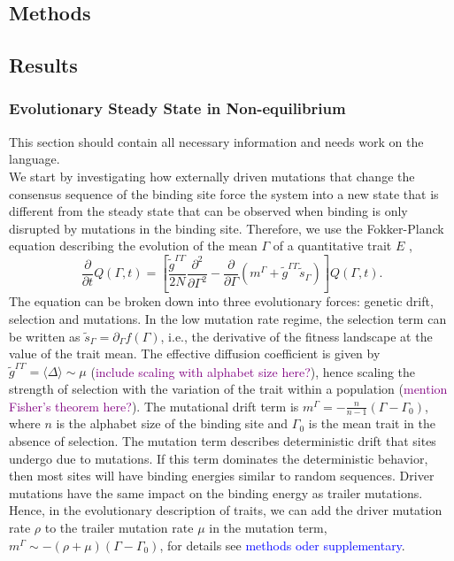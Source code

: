 \documentclass[10pt,a4paper]{article}
\newcommand{\purple}[1]{\textcolor{purple}{#1}}
\begin{document}
	\subsection*{Methods}
	

	

	\subsection*{Results}
	\subsubsection*{Evolutionary Steady State in Non-equilibrium}
	{\color{ForestGreen} This section should contain all necessary information and needs work on the language.}\\
	We start by investigating how externally driven mutations that change the consensus sequence of the binding site force the system into a new state that is different from the steady state that can be observed when binding is only disrupted by mutations in the binding site. Therefore, we use the Fokker-Planck equation describing the evolution of the mean $\Gamma$ of a quantitative trait $E$ \cite{nourmohammad_evolution_2013},
	\begin{equation}
		\frac{\partial}{\partial t}Q(\Gamma,t)=\left[\frac{\tilde{g}^{\Gamma\Gamma}}{2N}\frac{\partial^2}{\partial\Gamma^2}- \frac{\partial}{\partial\Gamma}\left(m^\Gamma+\tilde{g}^{\Gamma\Gamma}\tilde{s}_\Gamma\right)\right]Q(\Gamma,t)\label{equ:trait_diffusion}.
	\end{equation}
	The equation can be broken down into three evolutionary forces: genetic drift, selection and mutations. In the low mutation rate regime, the selection term can be written as $\tilde{s}_\Gamma = \partial_\Gamma f(\Gamma)$, i.e., the derivative of the fitness landscape at the value of the trait mean. The effective diffusion coefficient is given by $\tilde g^{\Gamma\Gamma} = \langle \Delta\rangle \sim \mu$ (\purple{include scaling with alphabet size here?}), hence scaling the strength of selection with the variation of the trait within a population (\purple{mention Fisher's theorem here?}). 
	The mutational drift term is $m^\Gamma = -\frac{n}{n-1} (\Gamma-\Gamma_0)$, where $n$ is the alphabet size of the binding site and $\Gamma_0$ is the mean trait in the absence of selection. 
	The mutation term describes deterministic drift that sites undergo due to mutations. If this term dominates the deterministic behavior, then most sites will have binding energies similar to random sequences. Driver mutations have the same impact on the binding energy as trailer mutations. Hence, in the evolutionary description of traits, we can add the driver mutation rate $\rho$ to the trailer mutation rate $\mu$ in the mutation term, $m^\Gamma\sim-(\rho+\mu)(\Gamma-\Gamma_0)$, for details see \textcolor{blue}{methods oder supplementary}.\\
\end{document}
